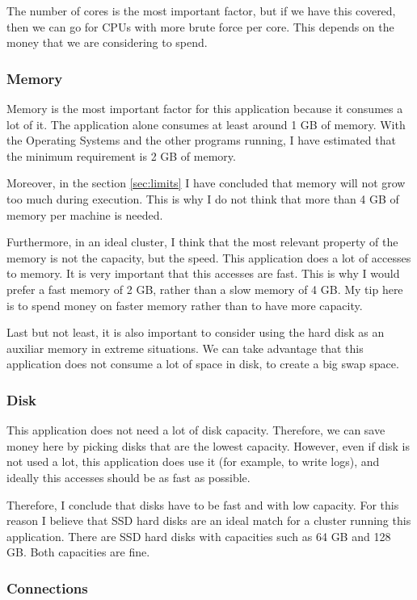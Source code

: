 The number of cores is the most important factor, but if we have this covered,
then we can go for CPUs with more brute force per core. This depends on the
money that we are considering to spend.

\subsubsection*{Memory}

Memory is the most important factor for this application because it consumes a
lot of it. The application alone consumes at least around 1 GB of memory. With
the Operating Systems and the other programs running, I have estimated that the
minimum requirement is 2 GB of memory.

Moreover, in the section \ref{sec:limits} I have concluded that memory will not
grow too much during execution. This is why I do not think that more than 4 GB
of memory per machine is needed.

Furthermore, in an ideal cluster, I think that the most relevant property of
the memory is not the capacity, but the speed. This application does a lot of
accesses to memory. It is very important that this accesses are fast. This is
why I would prefer a fast memory of 2 GB, rather than a slow memory of 4 GB. My
tip here is to spend money on faster memory rather than to have more capacity.

Last but not least, it is also important to consider using the hard disk as an
auxiliar memory in extreme situations. We can take advantage that this
application does not consume a lot of space in disk, to create a big swap space.

\subsubsection*{Disk}

This application does not need a lot of disk capacity. Therefore, we can save
money here by picking disks that are the lowest capacity. However, even if disk
is not used a lot, this application does use it (for example, to write logs),
and ideally this accesses should be as fast as possible.

Therefore, I conclude that disks have to be fast and with low capacity. For
this reason I believe that SSD hard disks are an ideal match for a cluster
running this application. There are SSD hard disks with capacities such as 64
GB and 128 GB. Both capacities are fine.

\subsubsection*{Connections}

